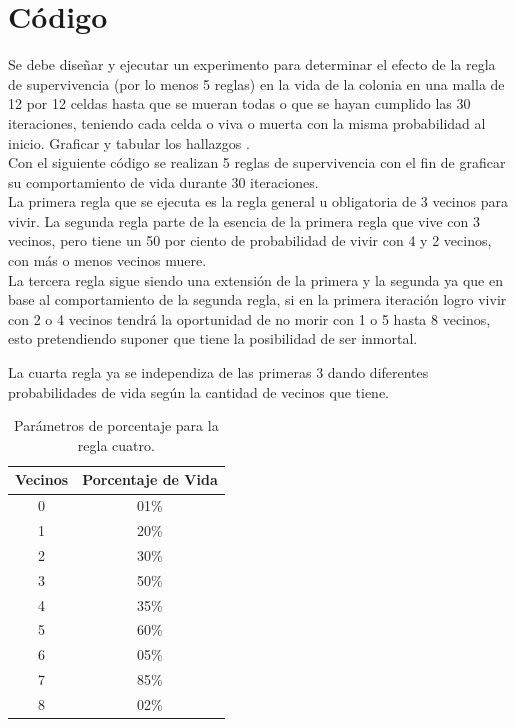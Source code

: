 \documentclass{article}
\begin{document}
\section{Código}
Se debe diseñar y ejecutar un experimento para determinar el efecto de la regla de supervivencia (por lo menos 5 reglas) en la vida de la colonia en una malla de 12 por 12 celdas hasta que se mueran todas o que se hayan cumplido las 30 iteraciones, teniendo cada celda o viva o muerta con la misma probabilidad al inicio. Graficar y tabular los hallazgos \cite{Satu_Elisa_Schaeffer}.\\
\newpage
Con el siguiente código se realizan 5 reglas de supervivencia con el fin de graficar su comportamiento de vida durante 30 iteraciones.\\
La primera regla que se ejecuta es la regla general u obligatoria de 3 vecinos para vivir. La segunda regla parte de la esencia de la primera regla que vive con 3 vecinos, pero tiene un 50 por ciento de probabilidad de vivir con 4 y 2 vecinos, con más o menos vecinos muere.\\
La tercera regla sigue siendo una extensión de la primera y la segunda ya que en base al comportamiento de la segunda regla, si en la primera iteración logro vivir con 2 o 4 vecinos tendrá la oportunidad de no morir con 1 o 5 hasta 8 vecinos, esto pretendiendo suponer que tiene la posibilidad de ser inmortal.

La cuarta regla ya se independiza de las primeras 3 dando diferentes probabilidades de vida según la cantidad de vecinos que tiene.

\begin{table}[h!]
\centering
 \begin{tabular}{||c c ||} 
 \hline
 Vecinos & Porcentaje de Vida  \\ [0.7ex] 
 \hline\hline
 0 & 01\% \\
 \hline
 1 & 20\% \\ 
 \hline
 2 & 30\%  \\
 \hline
 3 & 50\% \\
 \hline
 4 & 35\% \\
 \hline
 5 & 60\% \\ [1ex] 
 \hline
 6 & 05\% \\
 \hline
 7 & 85\% \\
 \hline
 8 & 02\% \\
 \hline
\end{tabular}
\caption{Parámetros de porcentaje para la regla cuatro.}
\label{table:1}
\end{table}
\end{document}
